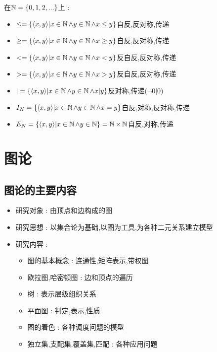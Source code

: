 {{{{    在$\operatorname{\mathbb{N}} = \left\{ 0,1,2,... \right\}$上 : \begin{itemize}
      \item $\leq = \left\{ \langle x,y\rangle | x \in \operatorname{\mathbb{N}} \land y \in \operatorname{\mathbb{N}} \land x \leq y \right\}$自反,反对称,传递
      \item $\geq = \left\{ \langle x,y\rangle | x \in \operatorname{\mathbb{N}} \land y \in \operatorname{\mathbb{N}} \land x \geq y \right\}$自反,反对称,传递
      \item $< = \left\{ \langle x,y\rangle | x \in \operatorname{\mathbb{N}} \land y \in \operatorname{\mathbb{N}} \land x < y \right\}$反自反,反对称,传递
      \item $> = \left\{ \langle x,y\rangle | x \in \operatorname{\mathbb{N}} \land y \in \operatorname{\mathbb{N}} \land x > y \right\}$反自反,反对称,传递
      \item $| = \left\{ \langle x,y\rangle | x \in \operatorname{\mathbb{N}} \land y \in \operatorname{\mathbb{N}} \land x | y \right\}$反对称,传递($\lnot 0 | 0$)
      \item $I_N = \left\{ \langle x,y\rangle | x \in \operatorname{\mathbb{N}} \land y \in \operatorname{\mathbb{N}} \land x = y \right\}$自反,对称,反对称,传递
      \item $E_N = \left\{ \langle x,y\rangle | x \in \operatorname{\mathbb{N}} \land y \in \operatorname{\mathbb{N}} \right\} = \operatorname{\mathbb{N}} \times \operatorname{\mathbb{N}}$自反,对称,传递
    \end{itemize}
  }%

}%

}%

\section{图论}{

  \subsection{图论的主要内容}{
    \begin{itemize}
      \item 研究对象 : 由顶点和边构成的图
      \item 研究思想 : 以集合论为基础,以图为工具,为各种二元关系建立模型
      \item 研究内容 : \begin{itemize}
              \item 图的基本概念 : 连通性,矩阵表示,带权图
              \item 欧拉图,哈密顿图 : 边和顶点的遍历
              \item 树 : 表示层级组织关系
              \item 平面图 : 判定,表示,性质
              \item 图的着色 : 各种调度问题的模型
              \item 独立集,支配集,覆盖集,匹配 : 各种应用问题
            \end{itemize}
    \end{itemize}
  }%

}}
